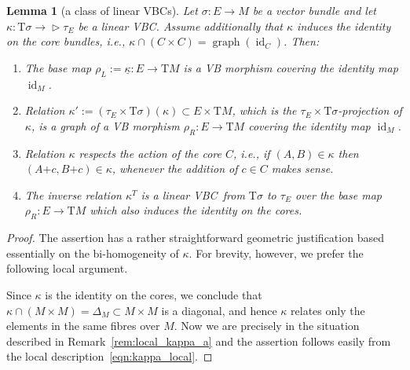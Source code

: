 \documentclass[pdftex]{sigma}
\newcommand{\ZM}{{VBC}} %
\newcommand{\und}{\underline}
\newcommand{\graf}{\operatorname{graph}}
\newcommand{\id}{\operatorname{id}}
\newcommand{\ra}{\rightarrow}
\newcommand{\plus}{\boldsymbol{\pmb{+}}}
\newcommand{\rhoL}{\rho_L} %
\newcommand{\rhoR}{\rho_R}
\newcommand{\T}{\mathrm{T}} %
\def\relto{\rightarrow\!\!\vartriangleright} %
\numberwithin{equation}{section}
\newtheorem{lem}[thm]{Lemma}
\theoremstyle{definition}
\begin{document}
\begin{lem}[a class of linear \ZM s]\label{lem:kappa_core} Let $\sigma\colon E\ra M$ be a vector bundle and let $\kappa\colon \T\sigma\relto \tau_E$ be a linear \ZM . Assume additionally that $\kappa$ induces the identity on the core bundles, i.e., $\kappa\cap(C\times C)=\graf(\id_C)$. Then:
\begin{enumerate}[$(i)$]\itemsep=0pt
	\item\label{cond:rho_l} The base map $\rhoL:=\und{\kappa}\colon E\ra \T M$ is a VB morphism covering the identity map $\id_M$.
	\item\label{cond:rho_r} Relation $\kappa':=(\tau_E\times\T\sigma)(\kappa)\subset E\times\T M$, which is the $\tau_E\times\T\sigma$-projection of $\kappa$, is a graph of a VB morphism $\rhoR\colon E\ra \T M$ covering the identity map $\id_M$.
	\item\label{cond:core_action} Relation $\kappa$ respects the action of the core $C$, i.e., if $(A,B)\in \kappa$ then
	$(A\plus c,B\plus c)\in\kappa$, whenever the addition of $c\in C$ makes sense.
	\item\label{cond:kappa_inverse} The inverse relation $\kappa^T$ is a linear \ZM\ from $\T\sigma$ to $\tau_E$ over the base map $\rhoR\colon E\ra \T M$ which also induces the identity on the cores.
\end{enumerate}
\end{lem}

\begin{proof}The assertion has a rather straightforward geometric justification based essentially on the bi-homogeneity of $\kappa$. For brevity, however, we prefer the following local argument.

Since $\kappa$ is the identity on the cores, we conclude that $\kappa\cap (M\times M) = \Delta_M\subset M\times M$ is a diagonal, and hence $\kappa$ relates only the elements in the same fibres over $M$. Now we are precisely in the situation described in Remark~\ref{rem:local_kappa_a} and the assertion follows easily from the local description~\eqref{eqn:kappa_local}. \end{proof}
\end{document}
